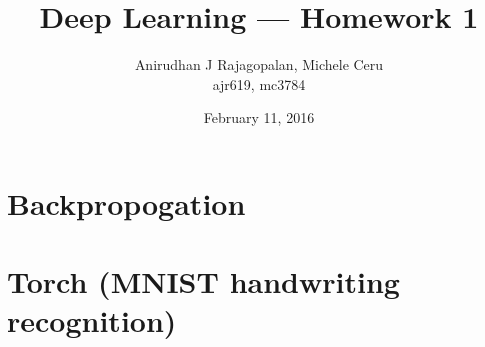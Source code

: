 \documentclass{article}
\begin{document}
\title{Deep Learning --- Homework 1}
\date{February 11, 2016}
\author{Anirudhan J Rajagopalan, Michele Ceru\\ ajr619, mc3784}

\maketitle

\newpage

\section{Backpropogation}
\section{Torch (MNIST handwriting recognition)}
\end{document}
